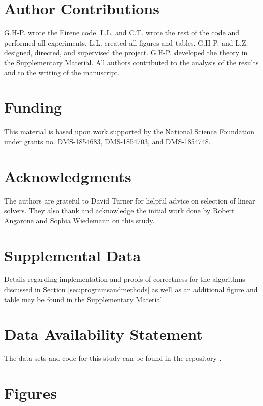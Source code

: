 \documentclass[utf8]{formatting_stuff/frontiersFPHY}
\newcommand{\se}{Section }
\theoremstyle{plain}
\theoremstyle{definition}
\begin{document}
\section{Author Contributions}

G.H-P. wrote the Eirene code. L.L. and C.T. wrote the rest of the code and performed all experiments. L.L. created all figures and tables. G.H-P. and L.Z. designed, directed, and supervised the project. G.H-P. developed the theory in the Supplementary Material. All authors contributed to the analysis of the results and to the writing of the manuscript.

\section{Funding}
This material is based upon work supported by the National Science Foundation under grants no. DMS-1854683, DMS-1854703, and DMS-1854748. 

\section{Acknowledgments} 
The authors are grateful to David Turner for helpful advice on selection of linear solvers. They also thank and acknowledge the initial work done by Robert Angarone and Sophia Wiedemann on this study.


\section{Supplemental Data}

Details regarding implementation and proofs of correctness for the algorithms discussed in \se \ref{sec:programsandmethods} as well as an additional figure and table may be found in the Supplementary Material.
 

\section{Data Availability Statement}
The data sets and code for this study can be found in the repository \cite{li_thompson}.

  


 
\section{Figures}
\label{figures} 
\end{document}

